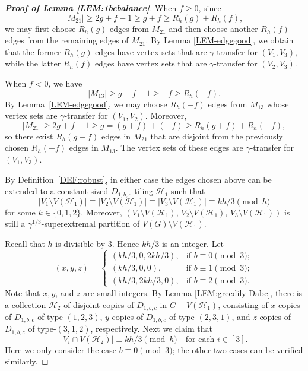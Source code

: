 \documentclass[11pt,a4paper,reqno]{amsart}
\theoremstyle{definition} %
\begin{document}
\begin{proof}[\textbf{Proof of Lemma \ref{LEM:1bcbalance}}]
When $f\geqslant 0$, since
$$
|M_{21}|\geqslant 2g+f-1\geqslant g+f\geqslant R_h(g)+R_h(f),
$$
we may first choose $R_h(g)$ edges from $M_{21}$ and then choose another $R_h(f)$ edges from the remaining edges of $M_{21}$. By Lemma \ref{LEM-edgegood}, we obtain that the former $R_h(g)$ edges have vertex sets that are $\gamma$-transfer for $(V_1,V_3)$, while the latter $R_h(f)$ edges have vertex sets that are $\gamma$-transfer for $(V_2,V_3)$.

When $f<0$, we have
$$
|M_{13}|\geqslant g-f-1\geqslant -f\geqslant R_h(-f).
$$
By Lemma~\ref{LEM-edgegood}, we may choose $R_h(-f)$ edges from $M_{13}$ whose vertex sets are $\gamma$-transfer for $(V_1,V_2)$. Moreover,
$$
|M_{21}|\geqslant 2g+f-1\geqslant g=(g+f)+(-f)\geqslant R_h(g+f)+R_h(-f),
$$
so there exist $R_h(g+f)$ edges in $M_{21}$ that are disjoint from the previously chosen $R_h(-f)$ edges in $M_{13}$. The vertex sets of these edges are $\gamma$-transfer for $(V_1,V_3)$.

By Definition~\ref{DEF:robust}, in either case the edges chosen above can be extended to a constant-sized $D_{1,b,c}$-tiling $\mathcal H_1$ such that
$$
|V_1\setminus V(\mathcal H_1)|\equiv |V_2\setminus V(\mathcal H_1)|\equiv |V_3\setminus V(\mathcal H_1)|\equiv kh/3 \pmod h
$$
for some $k\in\{0,1,2\}$. Moreover, $
(V_1\setminus V(\mathcal H_1),\,V_2\setminus V(\mathcal H_1),\,V_3\setminus V(\mathcal H_1))
$
is still a $\gamma^{1/3}$-superextremal partition of $V(G)\setminus V(\mathcal H_1)$.

Recall that $h$ is divisible by $3$. Hence $kh/3$ is an integer. Let
\begin{equation*}
(x,y,z) = \begin{cases}
(kh/3, 0, 2kh/3), & \mbox{if } b\equiv0\pmod{3}; \\
(kh/3, 0, 0), & \mbox{if } b\equiv1\pmod{3}; \\
(kh/3, 2kh/3, 0), & \mbox{if } b\equiv2\pmod{3}.
\end{cases}
\end{equation*}
Note that $x,y$, and $z$ are small integers. By Lemma \ref{LEM:greedily Dabc}, there is a collection $\mathcal{H}_2$ of disjoint copies of $D_{1,b,c}$ in $G- V(\mathcal{H}_1)$, consisting of $x$ copies of $D_{1,b,c}$ of type-$(1,2,3)$, $y$ copies of $D_{1,b,c}$ of type-$(2,3,1)$, and $z$ copies of $D_{1,b,c}$ of type-$(3,1,2)$, respectively. Next we claim that
$$
|V_i\cap V(\mathcal{H}_2)| \equiv kh/3\pmod h
\quad\text{for each } i\in[3].
$$
Here we only consider the case $b\equiv0\pmod{3}$; the other two cases can be verified similarly. 


\end{proof}
\end{document}
